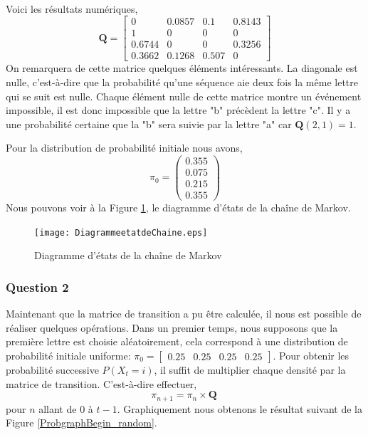 \documentclass[12pt]{article}
\begin{document}
\paragraph{}Voici les résultats numériques,
$$ \textbf{Q}=\begin{bmatrix}
0 & 0.0857 & 0.1 & 0.8143
\\1 & 0 &0 &0
\\0.6744 &0 &0 &0.3256
\\0.3662 & 0.1268 &0.507 &0
\end{bmatrix}$$
On remarquera de cette matrice quelques éléments intéressants. La diagonale est nulle, c'est-à-dire que la probabilité qu'une séquence aie deux fois la même lettre qui se suit est nulle. Chaque élément nulle de cette matrice montre un événement impossible, il est donc impossible que la lettre "b" précèdent la lettre "c". Il y a une probabilité certaine que la "b" sera suivie par la lettre "a" car $ \textbf{Q}(2,1) = 1$.

Pour la distribution de probabilité initiale nous avons,
$$\pi_0 = \left(\begin{array}{c}0.355\\ 0.075\\ 0.215\\ 0.355 \end{array}\right)$$
Nous pouvons voir à la Figure \ref{etatChaineMarkov}, le diagramme d'états de la chaîne de Markov.
\begin{figure}[!h]
\begin{framed}
      \centering
      \texttt{[image: DiagrammeetatdeChaine.eps]}
       \caption{Diagramme d'états de la chaîne de Markov}
       \label{etatChaineMarkov}
  \end{framed}
  \end{figure}
  
\subsubsection*{Question 2}
Maintenant que la matrice de transition a pu être calculée, il nous est possible de réaliser quelques opérations. Dans un premier temps, nous supposons que la première lettre est choisie aléatoirement, cela correspond à une distribution de probabilité initiale uniforme: $\pi_0 = \begin{bmatrix}
0.25 & 0.25 & 0.25 & 0.25
\end{bmatrix}$. Pour obtenir les probabilité successive $P(X_t = i)$, il suffit de multiplier chaque densité par la matrice de transition. C'est-à-dire effectuer,
$$ \pi_{n+1} = \pi_n \times \textbf{Q}\ $$
pour $n$ allant de $0$ à $t-1$. Graphiquement nous obtenons le résultat suivant de la Figure \ref{ProbgraphBegin_random}.
\end{document}
